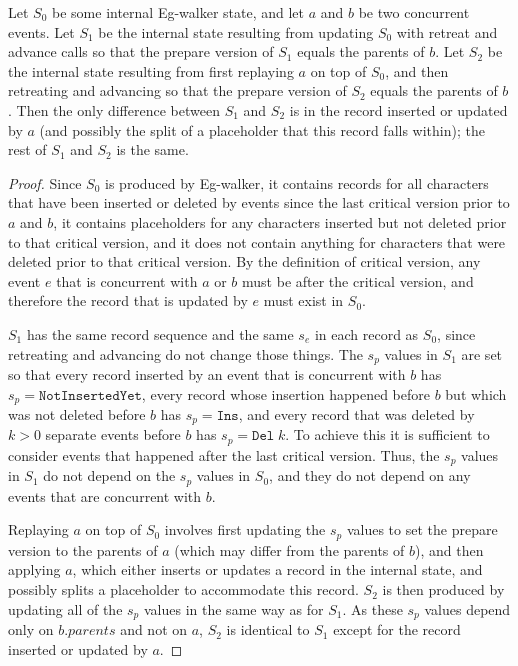 \documentclass[sigplan,10pt]{acmart}
\newcommand{\algname}{Eg-walker\xspace}
\begin{document}
\begin{lemma}\label{lemma-prepare-state}
  Let $S_0$ be some internal \algname state, and let $a$ and $b$ be two concurrent events.
  Let $S_1$ be the internal state resulting from updating $S_0$ with retreat and advance calls so that the prepare version of $S_1$ equals the parents of $b$.
  Let $S_2$ be the internal state resulting from first replaying $a$ on top of $S_0$, and then retreating and advancing so that the prepare version of $S_2$ equals the parents of $b$.
  Then the only difference between $S_1$ and $S_2$ is in the record inserted or updated by $a$ (and possibly the split of a placeholder that this record falls within); the rest of $S_1$ and $S_2$ is the same.
\end{lemma}
\begin{proof}
  Since $S_0$ is produced by \algname, it contains records for all characters that have been inserted or deleted by events since the last critical version prior to $a$ and $b$, it contains placeholders for any characters inserted but not deleted prior to that critical version, and it does not contain anything for characters that were deleted prior to that critical version.
  By the definition of critical version, any event $e$ that is concurrent with $a$ or $b$ must be after the critical version, and therefore the record that is updated by $e$ must exist in $S_0$.

  $S_1$ has the same record sequence and the same $s_e$ in each record as $S_0$, since retreating and advancing do not change those things.
  The $s_p$ values in $S_1$ are set so that every record inserted by an event that is concurrent with $b$ has $s_p = \texttt{NotInsertedYet}$, every record whose insertion happened before $b$ but which was not deleted before $b$ has $s_p = \texttt{Ins}$, and every record that was deleted by $k>0$ separate events before $b$ has $s_p = \texttt{Del}\; k$.
  To achieve this it is sufficient to consider events that happened after the last critical version.
  Thus, the $s_p$ values in $S_1$ do not depend on the $s_p$ values in $S_0$, and they do not depend on any events that are concurrent with $b$.

  Replaying $a$ on top of $S_0$ involves first updating the $s_p$ values to set the prepare version to the parents of $a$ (which may differ from the parents of $b$), and then applying $a$, which either inserts or updates a record in the internal state, and possibly splits a placeholder to accommodate this record.
  $S_2$ is then produced by updating all of the $s_p$ values in the same way as for $S_1$.
  As these $s_p$ values depend only on $b.\mathit{parents}$ and not on $a$, $S_2$ is identical to $S_1$ except for the record inserted or updated by $a$.
\end{proof}
\end{document}

